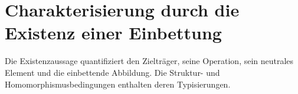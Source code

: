 \section{Charakterisierung durch die Existenz einer Einbettung}

Die Existenzaussage quantifiziert den Zielträger, seine Operation, sein
neutrales Element und die einbettende Abbildung. Die Struktur- und
Homomorphismusbedingungen enthalten deren Typisierungen.

\par{}
\hypertarget{differences.statement.FDNecessaryEmbeddingExists}{}
